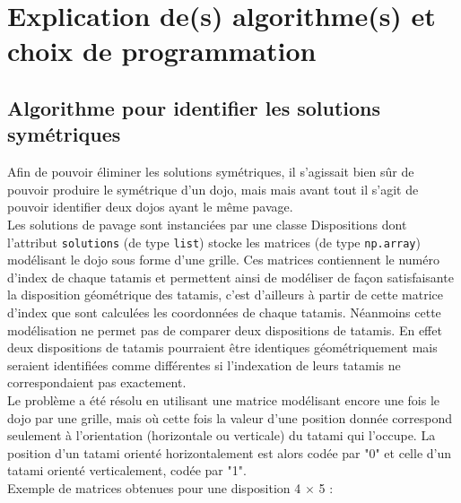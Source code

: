 \section{Explication de(s) algorithme(s) et choix de programmation}

\subsection{Algorithme pour identifier les solutions symétriques}

Afin de pouvoir éliminer les solutions symétriques, il s’agissait bien sûr de pouvoir produire le symétrique d’un dojo,
mais mais avant tout il s’agit de pouvoir identifier deux dojos ayant le même pavage.\\

Les solutions de pavage sont instanciées par une classe Dispositions dont l’attribut \texttt{solutions}  (de type \texttt{list}) stocke
les matrices (de type \texttt{np.array}) modélisant le dojo sous forme d’une grille. Ces matrices contiennent le numéro d’index de
chaque tatamis et permettent ainsi de modéliser de façon satisfaisante la disposition géométrique des tatamis, c’est d’ailleurs
à partir de cette matrice d’index que sont calculées les coordonnées de chaque tatamis. Néanmoins cette modélisation ne permet
pas de comparer deux dispositions de tatamis. En effet deux dispositions de tatamis pourraient être identiques géométriquement
mais seraient identifiées comme différentes si l’indexation de leurs tatamis ne correspondaient pas exactement.\\

Le problème a été résolu en utilisant une matrice modélisant encore une fois le dojo par une grille, mais où cette fois la valeur d’une
position donnée correspond seulement à l’orientation (horizontale ou verticale) du tatami qui l’occupe. La position d'un tatami orienté
horizontalement est alors codée par "0" et celle d'un tatami orienté verticalement, codée par "1".\\

Exemple de matrices obtenues pour une disposition 4 $\times$ 5 :

